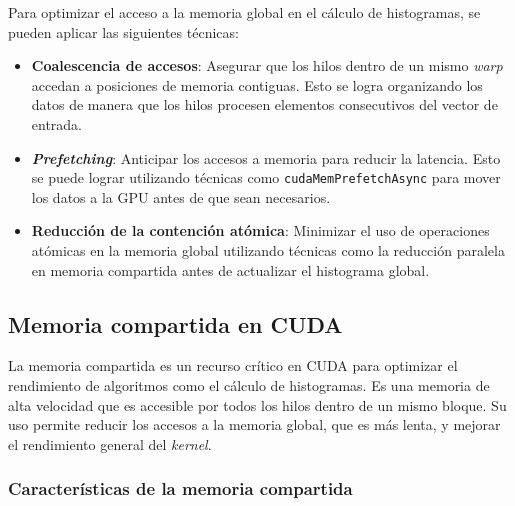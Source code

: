             Para optimizar el acceso a la memoria global en el cálculo de histogramas, se pueden aplicar las siguientes técnicas:
            
            \begin{itemize}
                
                \item \textbf{Coalescencia de accesos}: Asegurar que los hilos dentro de un mismo \textit{warp} accedan a posiciones de memoria contiguas. Esto se logra organizando los datos de manera que los hilos procesen elementos consecutivos del vector de entrada.
                
                \item \textbf{\textit{Prefetching}}: Anticipar los accesos a memoria para reducir la latencia. Esto se puede lograr utilizando técnicas como \texttt{cudaMemPrefetchAsync} para mover los datos a la GPU antes de que sean necesarios.
                
                \item \textbf{Reducción de la contención atómica}: Minimizar el uso de operaciones atómicas en la memoria global utilizando técnicas como la reducción paralela en memoria compartida antes de actualizar el histograma global.
          
            \end{itemize}

    \subsection{Memoria compartida en CUDA}

        La memoria compartida es un recurso crítico en CUDA para optimizar el rendimiento de algoritmos como el cálculo de histogramas. Es una memoria de alta velocidad que es accesible por todos los hilos dentro de un mismo bloque. Su uso permite reducir los accesos a la memoria global, que es más lenta, y mejorar el rendimiento general del \textit{kernel}.

        \subsubsection{Características de la memoria compartida}
        
